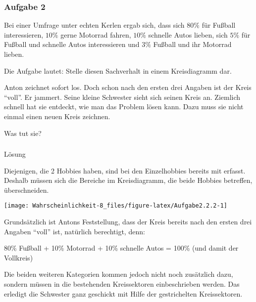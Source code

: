 \documentclass[
  ngerman,
]{book}
\begin{document}
\hypertarget{section-17}{%
\subsubsection*{}\label{section-17}}

\hypertarget{aufgabe-2-2}{%
\subsubsection*{Aufgabe 2}\label{aufgabe-2-2}}

Bei einer Umfrage unter echten Kerlen ergab sich, dass sich \(80\%\) für Fußball interessieren, \(10\%\) gerne Motorrad fahren, \(10\%\) schnelle Autos lieben, sich \(5\%\) für Fußball und schnelle Autos interessieren und \(3\%\) Fußball und ihr Motorrad lieben.

Die Aufgabe lautet: Stelle diesen Sachverhalt in einem Kreisdiagramm dar.

Anton zeichnet sofort los. Doch schon nach den ersten drei Angaben ist der Kreis ``voll''. Er jammert. Seine kleine Schwester sieht sich seinen Kreis an. Ziemlich schnell hat sie entdeckt, wie man das Problem lösen kann. Dazu muss sie nicht einmal einen neuen Kreis zeichnen.

Was tut sie?

\hypertarget{section-18}{%
\subsubsection*{}\label{section-18}}

Lösung

Diejenigen, die 2 Hobbies haben, sind bei den Einzelhobbies bereits mit erfasst. Deshalb müssen sich die Bereiche im Kreisdiagramm, die beide Hobbies betreffen, überschneiden.

\begin{center}\texttt{[image: Wahrscheinlichkeit-8\_files/figure-latex/Aufgabe2.2.2-1]} \end{center}

Grundsätzlich ist Antons Feststellung, dass der Kreis bereits nach den ersten drei Angaben ``voll'' ist, natürlich berechtigt, denn:

80\% Fußball + 10\% Motorrad + 10\% schnelle Autos = 100\% (und damit der Vollkreis)

Die beiden weiteren Kategorien kommen jedoch nicht noch zusätzlich dazu, sondern müssen in die bestehenden Kreissektoren einbeschrieben werden. Das erledigt die Schwester ganz geschickt mit Hilfe der gestrichelten Kreissektoren.
\end{document}
